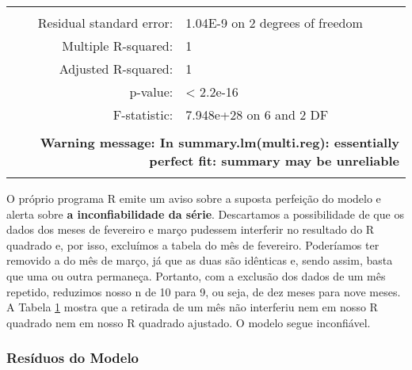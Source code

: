 \documentclass[12pt]{article}
\begin{document}
\begin{landscape}
\begin{table}[htbp]
\begin{tabular}{rrrrrrr}
         &      &      &      &      &      &  \\
    \multicolumn{2}{r}{Residual standard error: } & \multicolumn{5}{l}{1.04E-9  on 2 degrees of freedom} \\
    \multicolumn{2}{r}{Multiple R-squared: } & \multicolumn{1}{l}{1} & \multicolumn{2}{r}{} &      &  \\
    \multicolumn{2}{r}{Adjusted R-squared:} & \multicolumn{1}{l}{1} &      &      &      &  \\
    \multicolumn{2}{r}{p-value: } & \multicolumn{1}{l}{< 2.2e-16} &      &      &      &  \\
    \multicolumn{2}{r}{F-statistic: } & \multicolumn{5}{l}{7.948e+28 on 6 and 2 DF} \\
         &      &      &      &      &      &  \\
    \multicolumn{7}{r}{\textbf{Warning message: In summary.lm(multi.reg): essentially perfect fit: summary may be unreliable}} \\
         &      &      &      &      &      &  \\
    \hline
    \end{tabular}%
  \label{tab:tab12}%
\end{table}%
\end{landscape}

O próprio programa R emite um aviso sobre a suposta perfeição do modelo e alerta sobre \textbf{a inconfiabilidade da série}. Descartamos a possibilidade de que os dados dos meses de fevereiro e março pudessem interferir no resultado do R quadrado e, por isso, excluímos a tabela do mês de fevereiro. Poderíamos ter removido a do mês de março, já que as duas são idênticas e, sendo assim, basta que uma ou outra permaneça. Portanto, com a exclusão dos dados de um mês repetido, reduzimos nosso n de 10 para 9, ou seja, de dez meses para nove meses. A Tabela \ref{tab:tab12} mostra que a retirada de um mês não interferiu nem em nosso R quadrado nem em nosso R quadrado ajustado. O modelo segue inconfiável.\\    

\subsubsection{Resíduos do Modelo}
\end{document}
